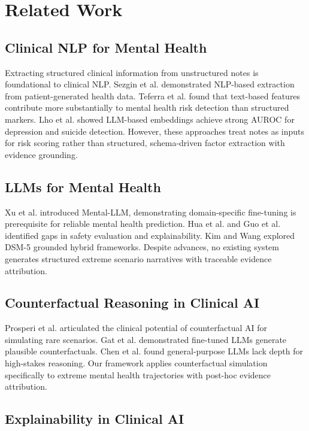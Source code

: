 \documentclass[conference]{IEEEtran}
\begin{document}
\section{Related Work}

\subsection{Clinical NLP for Mental Health}

Extracting structured clinical information from unstructured notes is foundational to clinical NLP. Sezgin et al. \cite{b3} demonstrated NLP-based extraction from patient-generated health data. Teferra et al. \cite{b15} found that text-based features contribute more substantially to mental health risk detection than structured markers. Lho et al. \cite{b16} showed LLM-based embeddings achieve strong AUROC for depression and suicide detection. However, these approaches treat notes as inputs for risk scoring rather than structured, schema-driven factor extraction with evidence grounding.

\subsection{LLMs for Mental Health}

Xu et al. \cite{b4} introduced Mental-LLM, demonstrating domain-specific fine-tuning is prerequisite for reliable mental health prediction. Hua et al. \cite{b6} and Guo et al. \cite{b5} identified gaps in safety evaluation and explainability. Kim and Wang \cite{b17} explored DSM-5 grounded hybrid frameworks. Despite advances, no existing system generates structured extreme scenario narratives with traceable evidence attribution.

\subsection{Counterfactual Reasoning in Clinical AI}

Prosperi et al. \cite{b8} articulated the clinical potential of counterfactual AI for simulating rare scenarios. Gat et al. \cite{b9} demonstrated fine-tuned LLMs generate plausible counterfactuals. Chen et al. \cite{b18} found general-purpose LLMs lack depth for high-stakes reasoning. Our framework applies counterfactual simulation specifically to extreme mental health trajectories with post-hoc evidence attribution.

\subsection{Explainability in Clinical AI}
\end{document}
